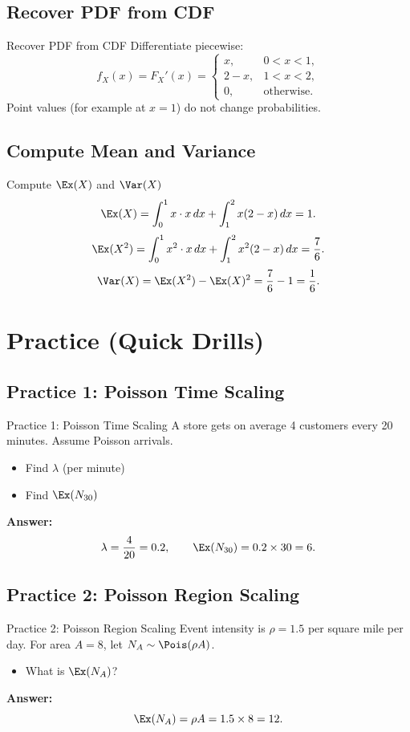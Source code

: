 \documentclass[aspectratio=169]{beamer}
\begin{document}
\subsection{Recover PDF from CDF}
\begin{frame}{Recover PDF from CDF}
  Differentiate piecewise:
  \[
    f_X(x)=F_X'(x)=
    \begin{cases}
      x, & 0<x<1,\\
      2-x, & 1<x<2,\\
      0, & \text{otherwise}.
    \end{cases}
  \]
  Point values (for example at \(x=1\)) do not change probabilities.
\end{frame}

\subsection{Compute Mean and Variance}
\begin{frame}{Compute \(\Ex(X)\) and \(\Var(X)\)}
  \[
    \Ex(X)=\int_0^1 x\cdot x\,dx + \int_1^2 x(2-x)\,dx = 1.
  \]
  \[
    \Ex(X^2)=\int_0^1 x^2\cdot x\,dx + \int_1^2 x^2(2-x)\,dx = \frac{7}{6}.
  \]
  \[
    \Var(X)=\Ex(X^2)-\Ex(X)^2=\frac{7}{6}-1=\frac{1}{6}.
  \]
\end{frame}

\section{Practice (Quick Drills)}

\subsection{Practice 1: Poisson Time Scaling}
\begin{frame}{Practice 1: Poisson Time Scaling}
  A store gets on average 4 customers every 20 minutes.
  Assume Poisson arrivals.
  \begin{itemize}
    \item Find \(\lambda\) (per minute)
    \item Find \(\Ex(N_{30})\)
  \end{itemize}
  \pause
  \textbf{Answer:}
  \[
    \lambda=\frac{4}{20}=0.2,\qquad \Ex(N_{30})=0.2\times 30=6.
  \]
\end{frame}

\subsection{Practice 2: Poisson Region Scaling}
\begin{frame}{Practice 2: Poisson Region Scaling}
  Event intensity is \(\rho=1.5\) per square mile per day.
  For area \(A=8\), let \(N_A\sim\Pois(\rho A)\).
  \begin{itemize}
    \item What is \(\Ex(N_A)\)?
  \end{itemize}
  \pause
  \textbf{Answer:}
  \[
    \Ex(N_A)=\rho A=1.5\times 8=12.
  \]
\end{frame}
\end{document}
